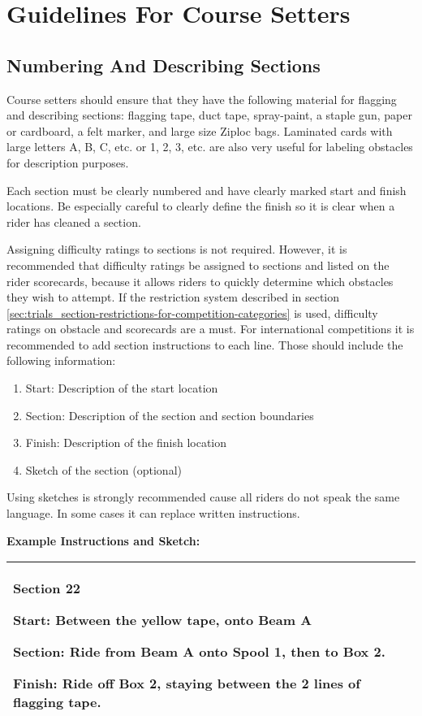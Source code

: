 \section{Guidelines For Course Setters \label{sec:trials_guidelines-for-course-setters}}

\subsection{Numbering And Describing Sections}
Course setters should ensure that they have the following material for flagging and describing sections: flagging tape, duct tape, spray-paint, a staple gun, paper or cardboard, a felt marker, and large size Ziploc bags. 
Laminated cards with large letters A, B, C, etc. or 1, 2, 3, etc. are also very useful for labeling obstacles for description purposes.

Each section must be clearly numbered and have clearly marked start and finish locations. 
Be especially careful to clearly define the finish so it is clear when a rider has cleaned a section.

Assigning difficulty ratings to sections is not required. 
However, it is recommended that difficulty ratings be assigned to sections and listed on the rider scorecards, because it allows riders to quickly determine which obstacles they wish to attempt. 
If the restriction system described in section \ref{sec:trials_section-restrictions-for-competition-categories} is used, difficulty ratings on obstacle and scorecards are a must. 
For international competitions it is recommended to add section instructions to each line. 
Those should include the following information:

\begin{enumerate}
\item  Start: Description of the start location
\item Section: Description of the section and section boundaries
\item Finish: Description of the finish location
\item Sketch of the section (optional)
\end{enumerate}
Using sketches is strongly recommended cause all riders do not speak the same language. 
In some cases it can replace written instructions.

\textbf{Example Instructions and Sketch:}

\begin{tabular}{|p{8cm} r|}
\hline
\vspace{1mm}
\textbf{Section 22}

\textbf{Start:} Between the yellow tape, onto Beam A

\textbf{Section:} Ride from Beam A onto Spool 1, then to Box 2.

\textbf{Finish:} Ride off Box 2, staying between the 2 lines of flagging tape.
\vspace{8mm}
&
\raisebox{-1\height}{\texttt{[image: trials]} }\\
\hline
\end{tabular}


